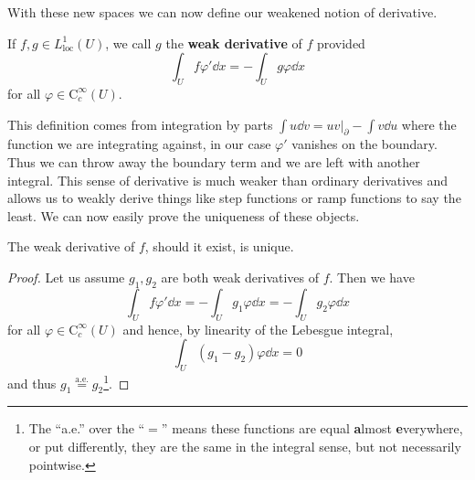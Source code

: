 With these new spaces we can now define our weakened notion of derivative.
\begin{definition}
    If \(f,g \in L^1_\mathrm{loc}(U)\), we call \(g\) the
    \textbf{weak derivative} of \(f\) provided
    \begin{equation}
        \int_U f\varphi'\dd{x} = -\int_U g\varphi\dd{x}
    \end{equation}
    for all \(\varphi\in\mathrm{C}_c^\infty(U)\).
\end{definition}
This definition comes from integration by parts \(\int u\dd{v} = uv|_\partial - \int v\dd{u}\)
where the function we are integrating against, in our case \(\varphi'\) vanishes
on the boundary. Thus we can throw away the boundary term and we are left with
another integral. This sense of derivative is much weaker than ordinary
derivatives and allows us to weakly derive things like step functions or ramp
functions to say the least. We can now easily prove the uniqueness of these
objects.
\begin{lemma}
    The weak derivative of \(f\), should it exist, is unique.
\end{lemma}
\begin{proof}
    Let us assume \(g_1, g_2\) are both weak derivatives of \(f\). Then we have
    \begin{equation}
        \int_U f\varphi'\dd{x} = -\int_U g_1\varphi\dd{x} = -\int_U g_2\varphi\dd{x}
    \end{equation}
    for all \(\varphi\in \mathrm{C}_c^\infty(U)\) and hence, by linearity of the
    Lebesgue integral,
    \begin{equation}
        \int_U\left(g_1 - g_2\right)\varphi\dd{x} = 0
    \end{equation}
    and thus \(g_1\overset{\text{a.e.}}{=}g_2\)\footnote{The ``a.e.'' over the
        ``\(=\)'' means these functions are equal \textbf{a}lmost
        \textbf{e}verywhere, or put differently, they are the same in the integral
        sense, but not necessarily pointwise.}.
\end{proof}


